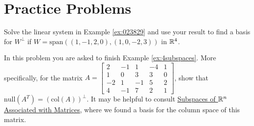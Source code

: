 \documentclass{ximera}
\begin{document}
\section*{Practice Problems}
\begin{problem}\label{prob:Uperp}
Solve the linear system in Example \ref{ex:023829} and use your result to find a basis for $W^\perp$ if $W = \mbox{span}\left((1, -1, 2, 0), (1, 0, -2, 3)\right)$ in $\mathbb{R}^4$.
\end{problem}

\begin{problem}\label{prob:finishex4subspaces}
In this problem you are asked to finish Example \ref{ex:4subspaces}.  More specifically, for the matrix $A=\begin{bmatrix}2&-1&1&-4&1\\1&0&3&3&0\\-2&1&-1&5&2\\4&-1&7&2&1\end{bmatrix}$, show that $\mbox{null}(A^T) = (\mbox{col}(A))^\perp$.  It may be helpful to consult \href{https://ximera.osu.edu/oerlinalg/LinearAlgebra/VSP-0040/main}{\underline{Subspaces of $\mathbb{R}^n$ Associated with Matrices}}, where we found a basis for the column space of this matrix.
\end{problem}
\end{document}
